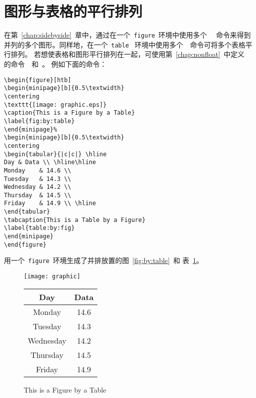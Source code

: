 \section{图形与表格的平行排列}\label{sec:figuretable}

在第~\ref{chap:sidebyside}~章中，通过在一个~\texttt{figure}~环境中使用多个
~~命令来得到并列的多个图形。同样地，在一个~\texttt{table}~
环境中使用多个~~命令可将多个表格平行排列。
若想使表格和图形平行排列在一起，可使用第~\ref{chap:nonfloat}~中定义
的命令~~和~。
例如下面的命令：
\begin{Verbatim}[xleftmargin=1cm]
\begin{figure}[htb] 
\begin{minipage}[b]{0.5\textwidth} 
\centering 
\texttt{[image: graphic.eps]} 
\caption{This is a Figure by a Table} 
\label{fig:by:table} 
\end{minipage}% 
\begin{minipage}[b]{0.5\textwidth} 
\centering
\begin{tabular}{|c|c|} \hline 
Day & Data \\ \hline\hline 
Monday    & 14.6 \\ 
Tuesday   & 14.3 \\ 
Wednesday & 14.2 \\ 
Thursday  & 14.5 \\ 
Friday    & 14.9 \\ \hline 
\end{tabular} 
\tabcaption{This is a Table by a Figure} 
\label{table:by:fig} 
\end{minipage} 
\end{figure}
\end{Verbatim}
用一个~\texttt{figure}~环境生成了并排放置的图~\ref{fig:by:table}~和
表~\ref{table:by:fig}。

\begin{figure}[htb]
	\begin{minipage}[b]{0.5\textwidth}
		\centering
		\texttt{[image: graphic]} 
		\caption{This is a Figure by a Table} 
		\label{fig:by:table} 
	\end{minipage}%
	\begin{minipage}[b]{0.5\textwidth} 
		\centering
		\begin{tabular}{|c|c|} \hline
			Day & Data \\ \hline\hline
			Monday    & 14.6 \\ 
			Tuesday   & 14.3 \\
			Wednesday & 14.2 \\ 
			Thursday  & 14.5 \\ 
			Friday    & 14.9 \\ \hline
		\end{tabular}
		\label{table:by:fig} 
	\end{minipage} 
\end{figure}

